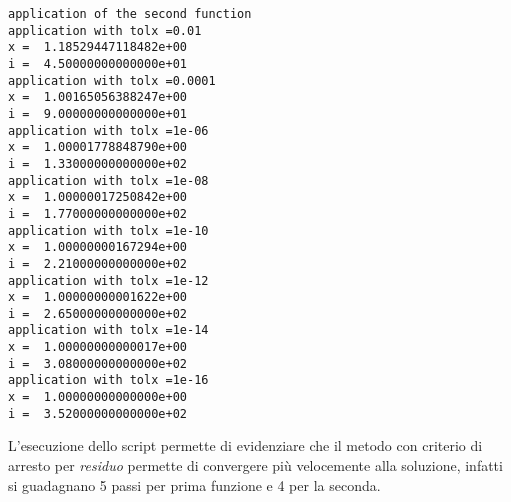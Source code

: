 \begin{oss}
\begin{multicols}{2}
\begin{lstlisting}
application of the second function
application with tolx =0.01
x =  1.18529447118482e+00
i =  4.50000000000000e+01
application with tolx =0.0001
x =  1.00165056388247e+00
i =  9.00000000000000e+01
application with tolx =1e-06
x =  1.00001778848790e+00
i =  1.33000000000000e+02
application with tolx =1e-08
x =  1.00000017250842e+00
i =  1.77000000000000e+02
application with tolx =1e-10
x =  1.00000000167294e+00
i =  2.21000000000000e+02
application with tolx =1e-12
x =  1.00000000001622e+00
i =  2.65000000000000e+02
application with tolx =1e-14
x =  1.00000000000017e+00
i =  3.08000000000000e+02
application with tolx =1e-16
x =  1.00000000000000e+00
i =  3.52000000000000e+02
\end{lstlisting}
\end{multicols}
L'esecuzione dello script permette di evidenziare che il metodo con criterio di
arresto per \emph{residuo} permette di convergere pi\`u velocemente alla
soluzione, infatti si guadagnano 5 passi per prima funzione e 4 per la seconda.
\end{oss}
